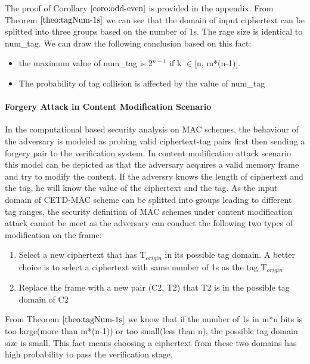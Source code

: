 The proof of Corollary $\ref{coro:odd-even}$ is provided in the appendix. 
From Theorem $\ref{theo:tagNum-1s}$ we can see that the domain of input ciphertext can be splitted into three groups based on the number of 1s. The rage size is identical to num\_tag. We can draw the following conclusion based on this fact:
\begin{itemize}
	\item the maximum value of num\_tag is 2$^{n-1}$ if k $\in$[n, m*(n-1)]. 
	\item The probability of tag collision is affected by the value of num\_tag
\end{itemize}
\paragraph{Forgery Attack in Content Modification Scenario}

In the computational based security analysis on MAC schemes, the behaviour of the adversary is modeled as probing valid ciphertext-tag pairs first then sending a forgery pair to the verification system. In content modification attack scenario this model can be depicted as that the adversary acquires a valid memory frame and try to modify the content. If the adversry knows the length of ciphertext and the tag, he will know the value of the ciphertext and the tag. 
As the input domain of CETD-MAC scheme can be splitted into groups leading to different tag ranges, the security definition of MAC schemes under content modification attack cannot be meet as the adversary can conduct the following two types of modification on the frame:
\begin{enumerate}
	\item Select a new ciphertext that has T$_{origin}$ in its possible tag domain. A better choice is to select a ciphertext with same number of 1s as the tag T$_{origin}$
	\item Replace the frame with a new pair (C2, T2) that T2 is in the possible tag domain of C2
\end{enumerate}
From Theorem $\ref{theo:tagNum-1s}$ we know that if the number of 1s in m*n bits is too large(more than m*(n-1)) or too small(less than n), the possible tag domain size is small. This fact means choosing a ciphertext from these two domains has high probability to pass the verification stage.

